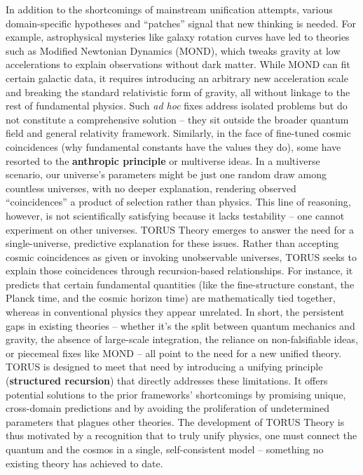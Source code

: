 \documentclass[
]{article}
\begin{document}
In addition to the shortcomings of mainstream unification attempts,
various domain-specific hypotheses and ``patches'' signal that new
thinking is needed. For example, astrophysical mysteries like galaxy
rotation curves have led to theories such as Modified Newtonian Dynamics
(MOND), which tweaks gravity at low accelerations to explain
observations without dark matter. While MOND can fit certain galactic
data, it requires introducing an arbitrary new acceleration scale and
breaking the standard relativistic form of gravity, all without linkage
to the rest of fundamental physics. Such \emph{ad hoc} fixes address
isolated problems but do not constitute a comprehensive solution -- they
sit outside the broader quantum field and general relativity framework.
Similarly, in the face of fine-tuned cosmic coincidences (why
fundamental constants have the values they do), some have resorted to
the \textbf{anthropic principle} or multiverse ideas. In a multiverse
scenario, our universe's parameters might be just one random draw among
countless universes, with no deeper explanation, rendering observed
``coincidences'' a product of selection rather than physics. This line
of reasoning, however, is not scientifically satisfying because it lacks
testability -- one cannot experiment on other universes. TORUS Theory
emerges to answer the need for a single-universe, predictive explanation
for these issues. Rather than accepting cosmic coincidences as given or
invoking unobservable universes, TORUS seeks to explain those
coincidences through recursion-based relationships. For instance, it
predicts that certain fundamental quantities (like the fine-structure
constant, the Planck time, and the cosmic horizon time) are
mathematically tied together, whereas in conventional physics they
appear unrelated. In short, the persistent gaps in existing theories --
whether it's the split between quantum mechanics and gravity, the
absence of large-scale integration, the reliance on non-falsifiable
ideas, or piecemeal fixes like MOND -- all point to the need for a new
unified theory. TORUS is designed to meet that need by introducing a
unifying principle (\textbf{structured recursion}) that directly
addresses these limitations. It offers potential solutions to the prior
frameworks' shortcomings by promising unique, cross-domain predictions
and by avoiding the proliferation of undetermined parameters that
plagues other theories. The development of TORUS Theory is thus
motivated by a recognition that to truly unify physics, one must connect
the quantum and the cosmos in a single, self-consistent model --
something no existing theory has achieved to date.
\end{document}
